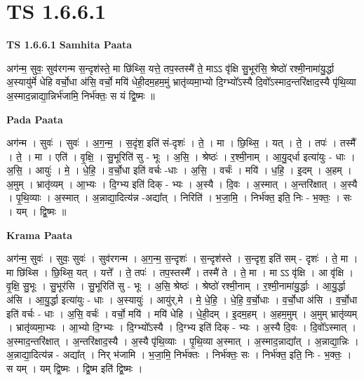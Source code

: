 \documentclass[17pt]{extarticle}
\begin{document}
\section{ TS 1.6.6.1 }

\textbf{TS 1.6.6.1 } \newline
\textbf{Samhita Paata} \newline

अग॑न्म॒ सुवः॒ सुव॑रगन्म स॒न्दृश॑स्ते॒ मा छि॑थ्सि॒ यत्ते॒ तप॒स्तस्मै॑ ते॒ माऽऽ वृ॑क्षि सु॒भूर॑सि॒ श्रेष्ठो॑ रश्मी॒नामा॑यु॒र्द्धा अ॒स्यायु॑र्मे धेहि वर्चो॒धा अ॑सि॒ वर्चो॒ मयि॑ धेही॒दम॒हम॒मुं भ्रातृ॑व्यमा॒भ्यो दि॒ग्भ्यो᳚ऽस्यै दि॒वो᳚ऽस्माद॒न्तरि॑क्षाद॒स्यै पृ॑थि॒व्या अ॒स्माद॒न्नाद्या॒न्निर्भ॑जामि॒ निर्भ॑क्तः॒ स यं द्वि॒ष्मः ॥ \newline

\textbf{Pada Paata} \newline

अग॑न्म । सुवः॑ । सुवः॑ । अ॒ग॒न्म॒ । स॒दृंश॒ इति॑ सं-दृशः॑ । ते॒ । मा । छि॒थ्सि॒ । यत् । ते॒ । तपः॑ । तस्मै᳚ । ते॒ । मा । एति॑ । वृ॒क्षि॒ । सु॒भूरिति॑ सु - भूः । अ॒सि॒ । श्रेष्ठः॑ । र॒श्मी॒नाम् । आ॒यु॒द्‌र्धा इत्या॑युः - धाः । अ॒सि॒ । आयुः॑ । मे॒ । धे॒हि॒ । व॒र्चो॒धा इति॑ वर्चः -धाः । अ॒सि॒ । वर्चः॑ । मयि॑ । ध॒हि॒ । इ॒दम् । अ॒हम् । अ॒मुम् । भ्रातृ॑व्यम् । आ॒भ्यः । दि॒ग्भ्य इति॑ दिक् - भ्यः । अ॒स्यै । दि॒वः । अ॒स्मात् । अ॒न्तरि॑क्षात् । अ॒स्यै । पृ॒थि॒व्याः । अ॒स्मात् । अ॒न्नाद्या॒दित्य॑न्न -अद्या᳚त् । निरिति॑ । भ॒जा॒मि॒ । निर्भ॑क्त॒ इति॒ निः - भ॒क्तः॒ । सः । यम् । द्वि॒ष्मः ॥  \newline


\textbf{Krama Paata} \newline

अग॑न्म॒ सुवः॑ । सुवः॒ सुवः॑ । सुव॑रगन्म । अ॒ग॒न्म॒ स॒न्दृशः॑ । स॒न्दृश॑स्ते । स॒न्दृश॒ इति॑ सम् - दृशः॑ । ते॒ मा । मा छि॑थ्सि । छि॒थ्सि॒ यत् । यत्ते᳚ । ते॒ तपः॑ । तप॒स्तस्मै᳚ । तस्मै॑ ते । ते॒ मा । मा ऽऽ वृ॑क्षि । आ वृ॑क्षि । वृ॒क्षि॒ सु॒भूः । सु॒भूर॑सि । सु॒भूरिति॑ सु - भूः । अ॒सि॒ श्रेष्ठः॑ । श्रेष्ठो॑ रश्मी॒नाम् । र॒श्मी॒नामा॑यु॒र्द्धाः । आ॒यु॒र्द्धा अ॑सि । आ॒यु॒र्द्धा इत्या॑युः - धाः । अ॒स्यायुः॑ । आयु॑र्,मे । मे॒ धे॒हि॒ । धे॒हि॒ व॒र्चो॒धाः । व॒र्चो॒धा अ॑सि । व॒र्चो॒धा इति॑ वर्चः - धाः । अ॒सि॒ वर्चः॑ । वर्चो॒ मयि॑ । मयि॑ धेहि । धे॒ही॒दम् । इ॒दम॒हम् । अ॒हम॒मुम् । अ॒मुम् भ्रातृ॑व्यम् । भ्रातृ॑व्यमा॒भ्यः । आ॒भ्यो दि॒ग्भ्यः । दि॒ग्भ्यो᳚ऽस्यै । दि॒ग्भ्य इति॑ दिक् - भ्यः । अ॒स्यै दि॒वः । दि॒वो᳚ऽस्मात् । अ॒स्माद॒न्तरि॑क्षात् । अ॒न्तरि॑क्षाद॒स्यै । अ॒स्यै पृ॑थि॒व्याः । पृ॒थि॒व्या अ॒स्मात् । अ॒स्माद॒न्नाद्या᳚त् । अ॒न्नाद्या॒न्निः । अ॒न्नाद्या॒दित्य॑न्न - अद्या᳚त् । निर् भ॑जामि । भ॒जा॒मि॒ निर्भ॑क्तः । निर्भ॑क्तः॒ सः । निर्भ॑क्त॒ इति॒ निः - भ॒क्तः॒ । स यम् । यम् द्वि॒ष्मः । द्वि॒ष्म इति॑ द्वि॒ष्मः । \newline
\end{document}
